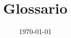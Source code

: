 \documentclass[openany,12pt,a4paper]{report}
\title{Glossario}
\author{}
\date{\today}
\begin{document}
	\printglossaries
\end{document}
